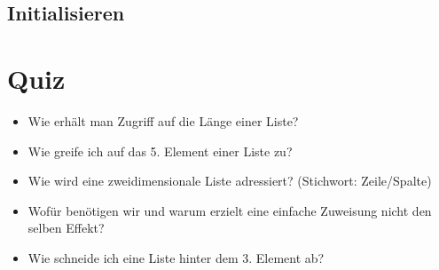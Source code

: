 \subsection{Initialisieren}
\begin{frame}
    \slidehead
    \vskip -12pt
\end{frame}

\livecoding

\section{Quiz}
\begin{frame}
    \slidehead
    \begin{itemize}
        \item Wie erhält man Zugriff auf die Länge einer Liste?
            \pause
        \item Wie greife ich auf das 5. Element einer Liste zu?
            \pause
        \item Wie wird eine zweidimensionale Liste adressiert? (Stichwort: Zeile/Spalte)
            \pause
        \item Wofür benötigen wir  und warum erzielt eine einfache Zuweisung nicht den selben Effekt?
            \pause
        \item Wie schneide ich eine Liste hinter dem 3. Element ab?
    \end{itemize}
\end{frame}



